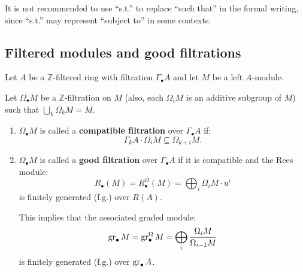 \begin{remark}
    It is not recommended to use ``s.t.'' to replace ``such that'' in the formal writing,
    since ``s.t.'' may represent ``subject to'' in some contexts.
\end{remark}

\subsection*{Filtered modules and good filtrations}
Let $A$ be a $\mathbb{Z}$-filtered ring with filtration $\Gamma_\bullet A$ and let $M$ be a left
$A$-module.

\begin{definition}\label{def:filtered-module}
    Let $\Omega_\bullet M$ be a $\mathbb{Z}$-filtration on $M$ (also, each $\Omega_i M$ is an additive subgroup of $M$) such that $\bigcup_k \Omega_k M = M$.

    \begin{enumerate}
        \item $\Omega_\bullet M$ is called a \textbf{compatible filtration} over $\Gamma_\bullet A$ if:
              \[
                  \Gamma_k A \cdot \Omega_i M \subseteq \Omega_{k+i} M.
              \]

        \item $\Omega_\bullet M$ is called a \textbf{good filtration} over $\Gamma_\bullet A$ if it is compatible and the Rees module:
              \[
                  R_\bullet(M) = R_\bullet^\Omega(M) = \bigoplus_i \Omega_i M \cdot u^i
              \]
              is finitely generated (f.g.) over $R(A)$.

              This implies that the associated graded module:
              \[
                  \operatorname{gr}_\bullet M = \operatorname{gr}_\bullet^\Omega M = \bigoplus_i \frac{\Omega_i M}{\Omega_{i-1} M}
              \]
              is finitely generated (f.g.) over $\operatorname{gr}_\bullet A$.
    \end{enumerate}
\end{definition}

